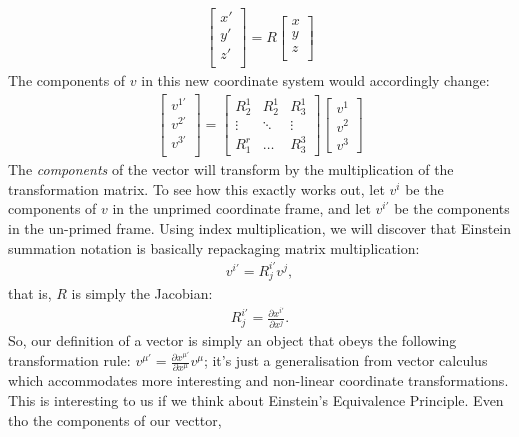 \documentclass[11pt]{article}
\theoremstyle{definition}
\begin{document}
\begin{align*}
	\begin{bmatrix}
		x' \\
		y' \\
		z' \\
	\end{bmatrix} = R \begin{bmatrix}
		x \\
		y \\
		z \\
	\end{bmatrix}
\end{align*}
The components of \( v \) in this new coordinate system would accordingly change:
\begin{align*}
	\begin{bmatrix}
		v^{1'} \\
		v^{2'} \\
		v^{3'} \\
	\end{bmatrix} = \begin{bmatrix}
		R^{1}_2 & R_2^1 & R_3^1 \\
		\vdots & \ddots & \vdots \\
		R_1^r & \hdots & R_3^3
	\end{bmatrix} \begin{bmatrix}
		v^1 \\
		v^2 \\
		v^3
	\end{bmatrix}
\end{align*}
The \emph{components} of the vector will transform by the multiplication of the transformation matrix. To see how this exactly works out, let \( v^i \) be the components of \( v \) in the unprimed coordinate frame, and let \( v^{i'} \) be the components in the un-primed frame. Using index multiplication, we will discover that Einstein summation notation is basically repackaging matrix multiplication:
\begin{align*}
	v^{i'} = R^{i'}_j v^j, 
\end{align*} 
that is, \( R \) is simply the Jacobian:
\begin{align*}
	R^{i'}_j = \frac{\partial x^{i'}}{\partial x^j}. 
\end{align*}
So, our definition of a vector is simply an object that obeys the following transformation rule: \( v^{\mu'} = \frac{\partial x^{\mu'}}{\partial x^\mu} v^\mu \); it's just a generalisation from vector calculus which accommodates more interesting and non-linear coordinate transformations. This is interesting to us if we think about Einstein's Equivalence Principle. Even tho the components of our vecttor, 
\end{document}
